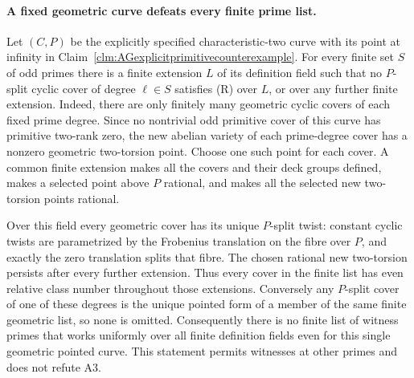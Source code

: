 \paragraph{A fixed geometric curve defeats every finite prime list.}
Let $(C,P)$ be the explicitly specified characteristic-two
curve with its point at infinity in
Claim~\ref{clm:AGexplicitprimitivecounterexample}.
For every finite set $S$ of odd primes there is a finite
extension $L$ of its definition field such that no
$P$-split cyclic cover of degree $\ell\in S$ satisfies
(R) over $L$, or over any further finite extension.
Indeed, there are only finitely many geometric cyclic
covers of each fixed prime degree. Since no nontrivial
odd primitive cover of this curve has primitive two-rank
zero, the new abelian variety of each prime-degree cover
has a nonzero geometric two-torsion point. Choose one
such point for each cover. A common finite extension
makes all the covers and their deck groups defined,
makes a selected point above $P$ rational, and makes
all the selected new two-torsion points rational.

Over this field every geometric cover has its unique
$P$-split twist: constant cyclic twists are parametrized
by the Frobenius translation on the fibre over $P$, and
exactly the zero translation splits that fibre.
The chosen rational new two-torsion persists after every
further extension. Thus every cover in the finite list
has even relative class number throughout those
extensions. Conversely any $P$-split cover of one of
these degrees is the unique pointed form of a member
of the same finite geometric list, so none is omitted.
Consequently there is no finite list of witness primes
that works uniformly over all finite definition fields
even for this single geometric pointed curve. This
statement permits witnesses at other primes and does
not refute A3.

